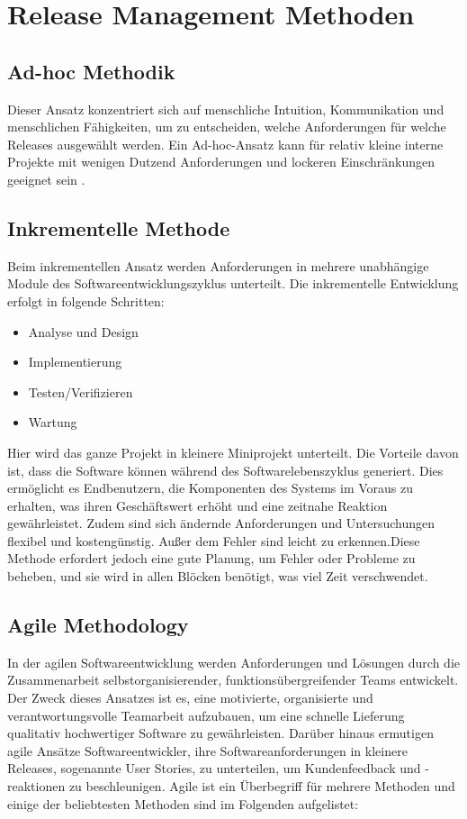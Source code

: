 \chapter{Release Management Methoden}

\section{Ad-hoc Methodik}

Dieser Ansatz konzentriert sich auf menschliche Intuition, Kommunikation und menschlichen Fähigkeiten, um zu entscheiden, welche Anforderungen für welche Releases ausgewählt werden. Ein Ad-hoc-Ansatz kann für relativ kleine interne Projekte mit wenigen Dutzend Anforderungen und lockeren Einschränkungen geeignet sein \cite{Mohamed2016:Devops}.

\section{Inkrementelle Methode}

Beim inkrementellen Ansatz werden Anforderungen in mehrere unabhängige Module des Softwareentwicklungszyklus unterteilt. Die inkrementelle Entwicklung erfolgt in folgende Schritten:
\begin{itemize}
	\item Analyse und Design
	\item Implementierung
	\item Testen/Verifizieren
	\item Wartung
\end{itemize}

Hier wird das ganze Projekt in kleinere Miniprojekt unterteilt. Die Vorteile davon ist, dass die Software können während des Softwarelebenszyklus generiert. Dies ermöglicht es Endbenutzern, die Komponenten des Systems im Voraus zu erhalten,
was ihren Geschäftswert erhöht und eine zeitnahe Reaktion gewährleistet. Zudem sind sich ändernde Anforderungen und Untersuchungen flexibel und kostengünstig. Außer dem Fehler sind leicht zu erkennen.Diese Methode erfordert jedoch eine
gute Planung, um Fehler oder Probleme zu beheben, und sie wird in allen Blöcken benötigt, was viel Zeit verschwendet.

\section{Agile Methodology}

In der agilen Softwareentwicklung werden Anforderungen und Lösungen durch die
Zusammenarbeit selbstorganisierender, funktionsübergreifender Teams entwickelt.
Der Zweck dieses Ansatzes ist es, eine motivierte, organisierte und verantwortungsvolle
Teamarbeit aufzubauen, um eine schnelle Lieferung qualitativ hochwertiger
Software zu gewährleisten\cite{digite.com:agile}. Darüber hinaus ermutigen agile Ansätze Softwareentwickler,
ihre Softwareanforderungen in kleinere Releases, sogenannte User Stories,
zu unterteilen, um Kundenfeedback und -reaktionen zu beschleunigen.
Agile ist ein Überbegriff für mehrere Methoden und einige der beliebtesten Methoden
sind im Folgenden aufgelistet:


